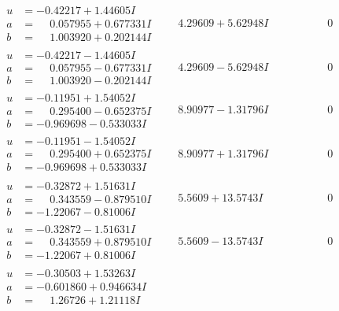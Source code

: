 \documentclass[1p]{elsarticle_modified}
\theoremstyle{definition}
\begin{document}
$$\begin{array}{c|c|c}
\begin{aligned}
u &= -0.42217 + 1.44605 I \\
a &= \phantom{-}0.057955 + 0.677331 I \\
b &= \phantom{-}1.003920 + 0.202144 I\end{aligned}
 & \phantom{-}4.29609 + 5.62948 I & \phantom{-0.000000 } 0 \\ \hline\begin{aligned}
u &= -0.42217 - 1.44605 I \\
a &= \phantom{-}0.057955 - 0.677331 I \\
b &= \phantom{-}1.003920 - 0.202144 I\end{aligned}
 & \phantom{-}4.29609 - 5.62948 I & \phantom{-0.000000 } 0 \\ \hline\begin{aligned}
u &= -0.11951 + 1.54052 I \\
a &= \phantom{-}0.295400 - 0.652375 I \\
b &= -0.969698 - 0.533033 I\end{aligned}
 & \phantom{-}8.90977 - 1.31796 I & \phantom{-0.000000 } 0 \\ \hline\begin{aligned}
u &= -0.11951 - 1.54052 I \\
a &= \phantom{-}0.295400 + 0.652375 I \\
b &= -0.969698 + 0.533033 I\end{aligned}
 & \phantom{-}8.90977 + 1.31796 I & \phantom{-0.000000 } 0 \\ \hline\begin{aligned}
u &= -0.32872 + 1.51631 I \\
a &= \phantom{-}0.343559 - 0.879510 I \\
b &= -1.22067 - 0.81006 I\end{aligned}
 & \phantom{-}5.5609 + 13.5743 I & \phantom{-0.000000 } 0 \\ \hline\begin{aligned}
u &= -0.32872 - 1.51631 I \\
a &= \phantom{-}0.343559 + 0.879510 I \\
b &= -1.22067 + 0.81006 I\end{aligned}
 & \phantom{-}5.5609 - 13.5743 I & \phantom{-0.000000 } 0 \\ \hline\begin{aligned}
u &= -0.30503 + 1.53263 I \\
a &= -0.601860 + 0.946634 I \\
b &= \phantom{-}1.26726 + 1.21118 I\end{aligned}

\end{array}$$
\end{document}
